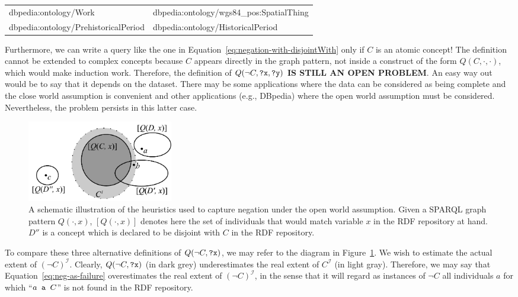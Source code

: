\documentclass[a4paper]{article}
\newcounter{ex}
\begin{document}
\begin{itemize}
\begin{center}
\begin{tabular}{|l|l|}
  dbpedia:ontology/Work                  & dbpedia:ontology/wgs84\_pos:SpatialThing \\
  dbpedia:ontology/PrehistoricalPeriod   & dbpedia:ontology/HistoricalPeriod \\
  \hline
  \end{tabular}
  \end{center}
  Furthermore, we can write a query like the one in Equation~\ref{eq:negation-with-disjointWith}
  only if $C$ is an atomic concept! The definition cannot be extended to complex concepts
  because $C$ appears directly in the graph pattern, not inside a construct of the form
  $Q(C, \cdot, \cdot)$, which would make induction work.
  Therefore, the definition of $Q(\neg C, \mbox{\tt ?x}, \mbox{\tt ?y})$
  \textbf{IS STILL AN OPEN PROBLEM}.
  An easy way out would be to say that it depends on the dataset.
  There may be some applications where the data can be considered as being complete
  and the close world assumption is convenient and other applications (e.g., DBpedia)
  where the open world assumption must be considered.
  Nevertheless, the problem persists in this latter case.

\begin{figure}
  \begin{center}
    \includegraphics[height=1.4in]{negation}
  \end{center}
  \caption{A schematic illustration of the heuristics used to capture negation
    under the open world assumption. Given a SPARQL graph pattern $Q(\cdot, x)$,
    $[Q(\cdot, x)]$ denotes here the set of individuals that would match variable
    $x$ in the RDF repository at hand. $D''$ is a concept which is declared to
    be disjoint with $C$ in the RDF repository.\label{fig:negation}}
\end{figure}

To compare these three alternative definitions of $Q(\neg C, \mbox{\tt ?x})$,
we may refer to the diagram in Figure~\ref{fig:negation}. We wish to estimate
the actual extent of $(\neg C)^\mathcal{I}$. Clearly, $Q(\neg C, \mbox{\tt ?x})$
(in dark grey) underestimates the real extent of $C^\mathcal{I}$ (in light gray).
Therefore, we may say that Equation~\ref{eq:neg-as-failure} overestimates
the real extent of $(\neg C)^\mathcal{I}$,
in the sense that it will regard as instances of $\neg C$ all individuals $a$
for which ``$a \mbox{\tt\ a } C$'' is not found in the RDF repository.


\end{itemize}
\end{document}

